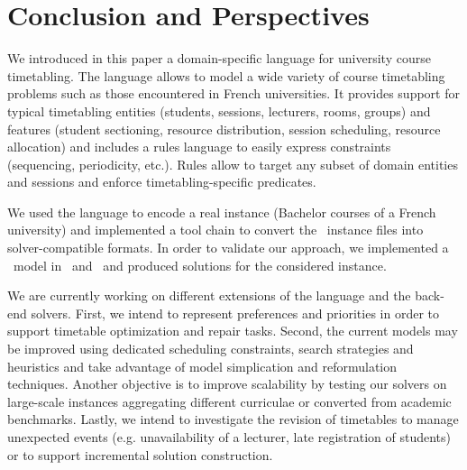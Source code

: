 \section{Conclusion and Perspectives}
\label{sec:conclusion}
We introduced in this paper a domain-specific language for university course timetabling. 
The language allows to model a wide variety of course timetabling problems
such as those encountered in French universities. 
It provides support for typical timetabling entities (students, sessions, lecturers, rooms, groups) and features (student sectioning, resource distribution, session scheduling, resource allocation) and includes a rules language to easily express constraints (sequencing, periodicity, etc.).
Rules allow to target any subset of domain entities and sessions and enforce timetabling-specific predicates.

We used the language to encode a real instance (Bachelor courses of a French university) and 
implemented a tool chain to convert the \XML\ instance files into solver-compatible formats.
In order to validate our approach, we implemented a \CSP\ model in \MINIZINC\ and \CHR\ and produced solutions for the considered instance.

We are currently working on different extensions of the language and the back-end solvers.
First, we intend to represent preferences and priorities in order to support timetable optimization and repair tasks.
Second, the current {\CP} models may be improved using dedicated scheduling constraints, search strategies and heuristics and take advantage of model simplication and reformulation techniques.
Another objective is to improve scalability by testing our solvers on large-scale instances aggregating different curriculae or converted from academic benchmarks.
Lastly, we intend to investigate the revision of timetables to manage unexpected events (e.g.  unavailability of a lecturer, late registration of students) or to support incremental solution construction. 






%
%


